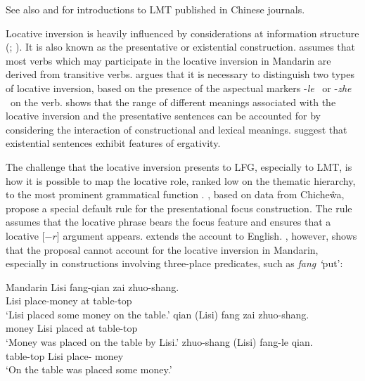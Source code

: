 \documentclass[output=paper,chinesefont,hidelinks]{langscibook}
\begin{document}
\noindent See also \citet{Fu1993} and \citet{Pan1997} for introductions to LMT published in Chinese journals.

\hspace*{-.1pt}Locative inversion is heavily influenced by considerations at information structure (\citealt{Bresnan89}; \citealt[209]{dalrymple01}). It is also known as the presentative or existential construction. \citet{Gu1992,Gu1997} assumes that most verbs which may participate in the locative inversion in Mandarin are derived from transitive verbs. \citet{Pan1996,Pan1997} argues that it is necessary to distinguish two types of locative inversion, based on the presence of the aspectual markers -\textit{le} \PFV\ or -\textit{zhe} \DUR\ on the verb. \citet{HuangEtAl1999} shows that the range of different meanings associated with the locative inversion and the presentative sentences can be accounted for by considering the interaction of constructional and lexical meanings. \citet{CuiYuan2020} suggest that existential sentences exhibit features of ergativity.

   The challenge that the locative inversion presents to LFG, especially to LMT, is how it is possible to map the locative role, ranked low on the thematic hierarchy, to the most prominent grammatical function {\SUBJ}. \citet{bresnan1989locative}, based on data from Chiche\^wa, propose a special default rule for the presentational focus construction. The rule assumes that the locative phrase bears the focus feature and ensures that a locative [$-r$] argument appears. \citet{Bresnan:Architecture} extends the account to English. \citet{HuangHer1998}, however, shows that the proposal cannot account for the locative inversion in Mandarin, especially in constructions involving three-place predicates, such as \textit{fang `}put':

\ea%
    \label{ex:Sinitic:58}Mandarin
    \ea\label{ex:Sinitic:58a}
    \gll Lisi  fang-qian     zai zhuo-shang.\\
         Lisi    place-money at   table-top\\
    \glt`Lisi placed some money on the table.'
    \ex\label{ex:Sinitic:58b}
    \gll qian  (Lisi)  fang  zai  zhuo-shang.\\
         money  {\db}Lisi   placed  at  table-top\\
    \glt`Money was placed on the table by Lisi.'
    \ex\label{ex:Sinitic:58c}
    \gll zhuo-shang   (Lisi)   fang-le    qian.\\
         table-top   {\db}Lisi  place-{\PFV}  money\\
    \glt`On the table was placed some money.'
    \z\z
\end{document}
